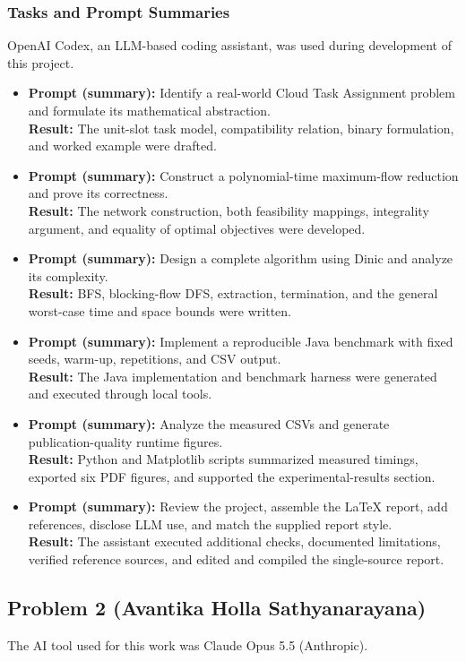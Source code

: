 \documentclass[conference]{IEEEtran}
\theoremstyle{definition}
\theoremstyle{remark}
\begin{document}
\subsubsection{Tasks and Prompt Summaries}
OpenAI Codex, an LLM-based coding assistant, was used during development
of this project. 
\begin{itemize}
\item \textbf{Prompt (summary):} Identify a real-world Cloud Task Assignment problem and formulate its mathematical abstraction.\\
\textbf{Result:} The unit-slot task model, compatibility relation, binary formulation, and worked example were drafted.
\item \textbf{Prompt (summary):} Construct a polynomial-time maximum-flow reduction and prove its correctness.\\
\textbf{Result:} The network construction, both feasibility mappings, integrality argument, and equality of optimal objectives were developed.
\item \textbf{Prompt (summary):} Design a complete algorithm using Dinic and analyze its complexity.\\
\textbf{Result:} BFS, blocking-flow DFS, extraction, termination, and the general worst-case time and space bounds were written.
\item \textbf{Prompt (summary):} Implement a reproducible Java benchmark with fixed seeds, warm-up, repetitions, and CSV output.\\
\textbf{Result:} The Java implementation and benchmark harness were generated and executed through local tools.
\item \textbf{Prompt (summary):} Analyze the measured CSVs and generate publication-quality runtime figures.\\
\textbf{Result:} Python and Matplotlib scripts summarized measured timings, exported six PDF figures, and supported the experimental-results section.
\item \textbf{Prompt (summary):} Review the project, assemble the LaTeX report, add references, disclose LLM use, and match the supplied report style.\\
\textbf{Result:} The assistant executed additional checks, documented limitations, verified reference sources, and edited and compiled the single-source report.
\end{itemize}

\subsection{Problem 2 (Avantika Holla Sathyanarayana)}
The AI tool used for this work was Claude Opus 5.5 (Anthropic).
\end{document}
